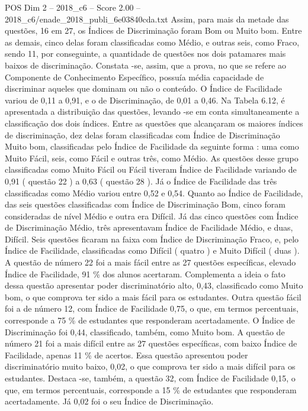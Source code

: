 \begin{textsample}{POS Dim 2 – 2018\_c6 – Score 2.00 – 2018\_c6/enade\_2018\_publi\_6e03840cda.txt}
Assim, para mais da metade das questões, 16 em 27, os Índices de Discriminação foram Bom ou Muito bom.
Entre as demais, cinco delas foram classificadas como Médio, e outras seis, como Fraco, sendo 11, por conseguinte, a quantidade de questões nos dois patamares mais baixos de discriminação.
Constata -se, assim, que a prova, no que se refere ao Componente de Conhecimento Específico, possuía média capacidade de discriminar aqueles que dominam ou não o conteúdo.
O Índice de Facilidade variou de 0,11 a 0,91, e o de Discriminação, de 0,01 a 0,46.
Na Tabela 6.12, é apresentada a distribuição das questões, levando -se em conta simultaneamente a classificação dos dois índices.
Entre as questões que alcançaram os maiores índices de discriminação, dez delas foram classificadas com Índice de Discriminação Muito bom, classificadas pelo Índice de Facilidade da seguinte forma : uma como Muito Fácil, seis, como Fácil e outras três, como Médio.
As questões desse grupo classificadas como Muito Fácil ou Fácil tiveram Índice de Facilidade variando de 0,91 ( questão 22 ) a 0,63 ( questão 28 ).
Já o Índice de Facilidade das três classificadas como Médio variou entre 0,52 e 0,54.
Quanto ao Índice de Facilidade, das seis questões classificadas com Índice de Discriminação Bom, cinco foram consideradas de nível Médio e outra era Difícil.
Já das cinco questões com Índice de Discriminação Médio, três apresentavam Índice de Facilidade Médio, e duas, Difícil.
Seis questões ficaram na faixa com Índice de Discriminação Fraco, e, pelo Índice de Facilidade, classificadas como Difícil ( quatro ) e Muito Difícil ( duas ).
A questão de número 22 foi a mais fácil entre as 27 questões específicas, elevado Índice de Facilidade, 91 \% dos alunos acertaram.
Complementa a ideia o fato dessa questão apresentar poder discriminatório alto, 0,43, classificado como Muito bom, o que comprova ter sido a mais fácil para os estudantes.
Outra questão fácil foi a de número 12, com Índice de Facilidade 0,75, o que, em termos percentuais, corresponde a 75 \% de estudantes que responderam acertadamente.
O Índice de Discriminação foi 0,44, classificado, também, como Muito bom.
A questão de número 21 foi a mais difícil entre as 27 questões específicas, com baixo Índice de Facilidade, apenas 11 \% de acertos.
Essa questão apresentou poder discriminatório muito baixo, 0,02, o que comprova ter sido a mais difícil para os estudantes.
Destaca -se, também, a questão 32, com Índice de Facilidade 0,15, o que, em termos percentuais, corresponde a 15 \% de estudantes que responderam acertadamente.
Já 0,02 foi o seu Índice de Discriminação.

\end{textsample}
